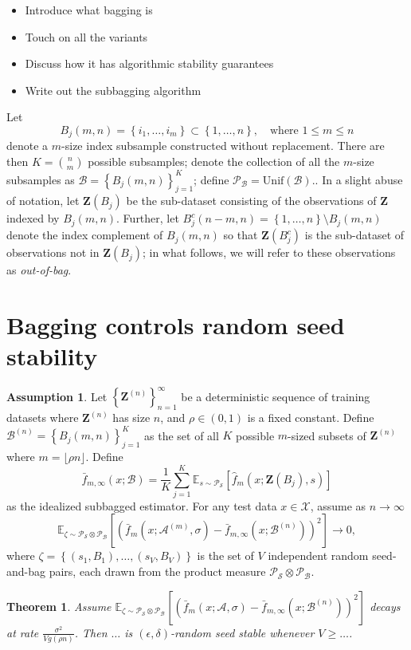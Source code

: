 \documentclass[ejsv2]{imsart}
\theoremstyle{plain}
\newtheorem{theorem}{Theorem}[section]
\theoremstyle{definition}
\newtheorem{assumption}{Assumption}
\theoremstyle{remark}
\newcommand{\E}{\mathds{E}}
\newcommand{\Z}{\mathbf{Z}}
\newcommand{\Sset}{\mathcal{S}}
\newcommand{\Ps}{\mathcal{P}_\Sset}
\newcommand{\Bset}{\mathcal{B}}
\newcommand{\Pb}{\mathcal{P}_\Bset}
\newcommand{\Zn}{\Z^{(n)}}
\newcommand{\Aset}{\mathcal{A}}
\begin{document}
\begin{itemize}
\item Introduce what bagging is
\item Touch on all the variants
\item Discuss how it has algorithmic stability guarantees
\item Write out the subbagging algorithm
\end{itemize}

Let
\[
B_j(m,n) = \left\{i_1, \dots, i_m \right\} \subset \left\{1, \dots, n\right\},\quad\text{where } 1 \leq m \leq n
\]
denote a $m$-size index subsample constructed without replacement. There are then $K = \binom{n}{m}$ possible subsamples; denote the collection of all the $m$-size subsamples as $\Bset = \left\{B_j(m,n) \right\}_{j=1}^K$; define $\Pb = \text{Unif}(\Bset)$.. In a slight abuse of notation, let $\Z(B_j)$ be the sub-dataset consisting of the observations of $\Z$ indexed by $B_j(m,n)$. Further, let $B_j^c(n-m,n) = \left\{1, \dots, n \right\} \setminus B_j(m,n)$ denote the index complement of $B_j(m,n)$ so that $\Z(B_j^c)$ is the sub-dataset of observations not in $\Z(B_j)$; in what follows, we will refer to these observations as \textit{out-of-bag}.

\section{Bagging controls random seed stability}

\begin{assumption}\label{ass:bvav}
Let $\left\{\Zn\right\}_{n=1}^\infty$ be a deterministic sequence of training datasets where $\Z^{(n)}$ has size $n$, and $\rho \in (0,1)$ is a fixed constant. Define $\Bset^{(n)} = \left\{B_j(m,n)\right\}_{j=1}^K$ as the set of all $K$ possible $m$-sized subsets of $\Zn$ where $m = \lfloor \rho n \rfloor$. Define
\[
\bar f_{m,\infty}(x;\Bset) = \frac{1}{K}\sum_{j=1}^K \E_{s \sim \Ps} \left[\hat f_m(x;\Z(B_j),s) \right]
\]
as the idealized subbagged estimator. For any test data $x \in \mathcal X$, assume as $n \rightarrow \infty$
\[
\E_{\zeta \sim \Ps \otimes \Pb}\left[\left(\bar f_m(x;  \Aset^{(m)},\sigma) - \bar f_{m,\infty}(x;\Bset^{(n)})\right)^2 \right] \rightarrow 0,
\]
where $\zeta = \left\{(s_1, B_1), \dots, (s_V, B_V) \right\}$ is the set of $V$ independent random seed-and-bag pairs, each drawn from the product measure $\Ps \otimes \Pb$.
\end{assumption}

\begin{theorem}\label{th:stability}
Assume $\E_{\zeta \sim \Ps \otimes \Pb}\left[\left(\bar f_m(x;  \Aset,\sigma) - \bar f_{m,\infty}(x;\Bset^{(n)})\right)^2 \right]$ decays at rate $\frac{\sigma^2}{V g(\rho n)}$. Then $\dots$ is $(\epsilon,\delta)$-random seed stable whenever $V \geq \dots $.
\end{theorem}
\end{document}
